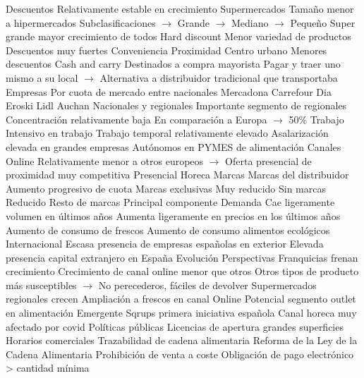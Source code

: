 \documentclass{nuevotema}
\begin{document}
\begin{esquemal}
				\4[] Descuentos
				\4[] Relativamente estable en crecimiento
				\4 Supermercados
				\4[] Tamaño menor a hipermercados
				\4[] Subclasificaciones
				\4[] $\to$ Grande
				\4[] $\to$ Mediano
				\4[] $\to$ Pequeño
				\4[] Super grande mayor crecimiento de todos
				\4 Hard discount
				\4[] Menor variedad de productos
				\4[] Descuentos muy fuertes
				\4 Conveniencia
				\4[] Proximidad
				\4[] Centro urbano
				\4[] Menores descuentos
				\4 Cash and carry
				\4[] Destinados a compra mayorista
				\4[] Pagar y traer uno mismo a su local
				\4[] $\to$ Alternativa a distribuidor tradicional que transportaba
			\3 Empresas
				\4 Por cuota de mercado entre nacionales
				\4[] Mercadona
				\4[] Carrefour
				\4[] Dia
				\4[] Eroski
				\4[] Lidl
				\4[] Auchan
				\4 Nacionales y regionales
				\4[] Importante segmento de regionales
				\4 Concentración relativamente baja
				\4[] En comparación a Europa
				\4[] $\to$ 50\%
			\3 Trabajo
				\4 Intensivo en trabajo
				\4 Trabajo temporal relativamente elevado
				\4 Asalarización elevada en grandes empresas
				\4 Autónomos en PYMES de alimentación
			\3 Canales
				\4 Online
				\4[] Relativamente menor a otros europeos
				\4[] $\to$ Oferta presencial de proximidad muy competitiva
				\4 Presencial
				\4 Horeca
			\3 Marcas
				\4 Marcas del distribuidor
				\4[] Aumento progresivo de cuota
				\4 Marcas exclusivas
				\4[] Muy reducido
				\4 Sin marcas
				\4[] Reducido
				\4 Resto de marcas
				\4[] Principal componente
			\3 Demanda
				\4 Cae ligeramente volumen en últimos años
				\4 Aumenta ligeramente en precios en los últimos años
				\4 Aumento de consumo de frescos
				\4 Aumento de consumo alimentos ecológicos
			\3 Internacional
				\4 Escasa presencia de empresas españolas en exterior
				\4 Elevada presencia capital extranjero en España
			\3 Evolución
			\3 Perspectivas
				\4 Franquicias frenan crecimiento
				\4 Crecimiento de canal online menor que otros
				\4[] Otros tipos de producto más susceptibles
				\4[] $\to$ No perecederos, fáciles de devolver
				\4 Supermercados regionales crecen
				\4 Ampliación a frescos en canal Online
				\4 Potencial segmento outlet en alimentación
				\4[] Emergente
				\4[] Sqrups primera iniciativa española
				\4 Canal horeca muy afectado por covid
			\3 Políticas públicas
				\4 Licencias de apertura grandes superficies
				\4 Horarios comerciales
				\4 Trazabilidad de cadena alimentaria
				\4 Reforma de la Ley de la Cadena Alimentaria
				\4[] Prohibición de venta a coste
				\4[] Obligación de pago electrónico > cantidad mínima

\end{esquemal}
\end{document}
